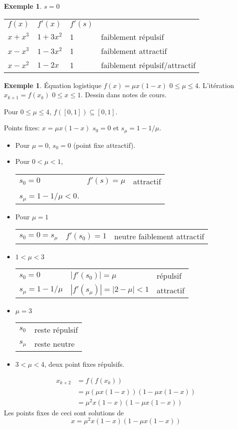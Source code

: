 \documentclass[11pt,a4paper]{article}
\theoremstyle{definition}
\newtheorem{myexem}[mydef]{Exemple}
\begin{document}
\begin{myexem}
  $s = 0$

  \begin{center}
    \begin{tabular}{llll}
      $f(x)$ & $f'(x)$ & $f'(s)$ & \\
      $x + x^3$ & $1 + 3x^2$ & 1 & faiblement répulsif\\
      $x - x^3$ & $1 - 3x^2$ & 1 & faiblement attractif\\
      $x - x^2$ & $1 - 2x$ & 1 & faiblement répulsif/attractif
    \end{tabular}
  \end{center}
\end{myexem}
\begin{myexem}
  Équation logistique $f(x) = \mu x(1-x)$
  $0 \leq \mu \leq 4$.
  L'itération $x_{k+1} = f(x_k)$ $0 \leq x \leq 1$.
  Dessin dans notes de cours.

  Pour $0 \leq \mu \leq 4$, $f([0,1]) \subseteq [0,1]$.

  Points fixes: $x = \mu x(1-x)$
  $s_0 = 0$ et $s_\mu = 1 - 1/\mu$.

  \begin{itemize}
    \item Pour $\mu = 0$, $s_0 = 0$ (point fixe attractif).
    \item Pour $0 < \mu < 1$,
      \begin{tabular}{lll}
        $s_0 = 0$ & $f'(s) = \mu$ & attractif\\
        $s_\mu = 1 - 1/\mu < 0$.
      \end{tabular}
    \item Pour $\mu = 1$
      \begin{tabular}{lll}
        $s_0 = 0 = s_\mu$ & $f'(s_0) = 1$ & neutre faiblement attractif
      \end{tabular}
    \item $1 < \mu < 3$
      \begin{tabular}{lll}
        $s_0 = 0$ & $|f'(s_0)| = \mu$ & répulsif\\
        $s_\mu = 1 - 1/\mu$ & $|f'(s_\mu)| = |2-\mu| < 1$ & attractif
      \end{tabular}
    \item $\mu = 3$
      \begin{tabular}{ll}
        $s_0$ & reste répulsif\\
        $s_\mu$ & reste neutre
      \end{tabular}
    \item $3 < \mu < 4$, deux point fixes répulsifs.
  \end{itemize}
  \begin{align*}
    x_{k+2} & = f(f(x_k))\\
            & = \mu (\mu x(1-x))(1 - \mu x(1-x))\\
            & = \mu^2 x(1-x)(1 - \mu x(1-x))
  \end{align*}
  Les points fixes de ceci sont solutions de
  $$x = \mu^2 x(1-x)(1 - \mu x(1-x))$$
\end{myexem}
\end{document}
